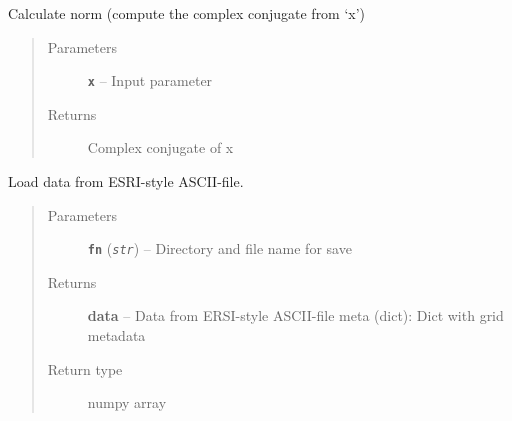 \documentclass[letterpaper,10pt,english]{sphinxmanual}
\begin{document}
\begin{fulllineitems}
\label{hyvr:hyvr.hyvr.utils.calc_norm}
Calculate norm (compute the complex conjugate from `x')
\begin{quote}\begin{description}
\item[{Parameters}] \leavevmode
\textbf{\texttt{x}} -- Input parameter

\item[{Returns}] \leavevmode
Complex conjugate of x

\end{description}\end{quote}

\end{fulllineitems}


\begin{fulllineitems}
\label{hyvr:hyvr.hyvr.utils.dem_load}
Load data from ESRI-style ASCII-file.
\begin{quote}\begin{description}
\item[{Parameters}] \leavevmode
\textbf{\texttt{fn}} (\emph{\texttt{str}}) -- Directory and file name for save

\item[{Returns}] \leavevmode
\textbf{data} -- Data from ERSI-style ASCII-file
meta (dict):            Dict with grid metadata

\item[{Return type}] \leavevmode
numpy array

\end{description}\end{quote}

\end{fulllineitems}

\end{document}
